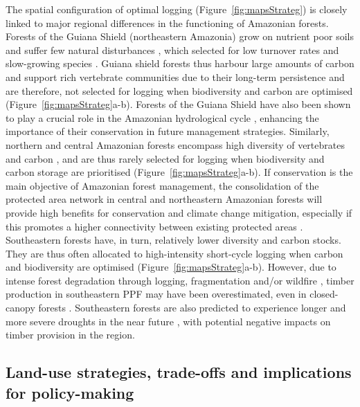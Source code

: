 \documentclass{article}
\begin{document}
The spatial configuration of optimal logging (Figure~\ref{fig:mapsStrateg}) is closely linked to major regional differences in the functioning of Amazonian forests. Forests of the Guiana Shield (northeastern Amazonia) grow on nutrient poor soils and suffer few natural disturbances \cite{Espirito-Santo2014}, which selected for low turnover rates and slow-growing species \cite{Grau2017}. Guiana shield forests thus harbour large amounts of carbon \cite{Avitabile2016} and support rich vertebrate communities \cite{Denis2018} due to their long-term persistence \cite{Barthe2017} and are therefore, not selected for logging when biodiversity and carbon are optimised (Figure~\ref{fig:mapsStrateg}a-b). Forests of the Guiana Shield have also been shown to play a crucial role in the Amazonian hydrological cycle \cite{Bovolo2018,Staal2018}, enhancing the importance of their conservation in future management strategies. Similarly, northern and central Amazonian forests encompass high diversity of vertebrates \cite{Jenkins2013} and carbon \cite{Avitabile2016}, and are thus rarely selected for logging when biodiversity and carbon storage are prioritised (Figure~\ref{fig:mapsStrateg}a-b). If conservation is the main objective of Amazonian forest management, the consolidation of the protected area network in central and northeastern Amazonian forests will provide high benefits for conservation and climate change mitigation, especially if this promotes a higher connectivity between existing protected areas \cite{Hansen2007}. Southeastern forests have, in turn, relatively lower diversity and carbon stocks. They are thus often allocated to high-intensity short-cycle logging when carbon and biodiversity are optimised (Figure~\ref{fig:mapsStrateg}a-b). However, due to intense forest degradation through logging, fragmentation and/or wildfire \cite{Davidson2012,Foley2007}, timber production in southeastern PPF may have been overestimated, even in closed-canopy forests \cite{Asner2004}. Southeastern forests are also predicted to experience longer and more severe droughts in the near future \cite{Duffy2015}, with potential negative impacts on timber provision in the region.  
 
\subsection{Land-use strategies, trade-offs and implications for policy-making}
\end{document}
